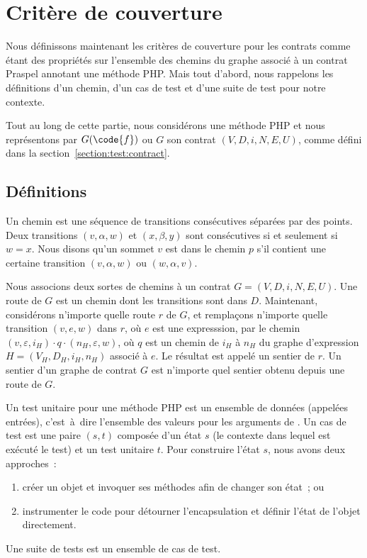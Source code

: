 \section{Critère de couverture}
\label{section:test:criteria}

Nous définissons maintenant les critères de couverture pour les contrats comme
étant des propriétés sur l'ensemble des chemins du graphe associé à un contrat
Praspel annotant une méthode PHP. Mais tout d'abord, nous rappelons les
définitions d'un chemin, d'un cas de test et d'une suite de test pour notre
contexte.

Tout au long de cette partie, nous considérons une méthode PHP  et nous
représentons par $G(\code{f})$ ou $G$ son contrat $(V, D, i, N, E, U)$, comme
défini dans la section~\ref{section:test:contract}.

\subsection{Définitions}

Un {\strong chemin} est une séquence de transitions consécutives séparées par
des points. Deux transitions $(v, \alpha, w)$ et $(x, \beta, y)$ sont
consécutives si et seulement si $w = x$. Nous disons qu'un sommet $v$ {\strong
est dans} le chemin $p$ s'il contient une certaine transition $(v, \alpha, w)$
ou $(w, \alpha, v)$.

Nous associons deux sortes de chemins à un contrat $G = (V, D, i, N, E, U)$. Une
{\strong route} de $G$ est un chemin dont les transitions sont dans $D$.
Maintenant, considérons n'importe quelle route $r$ de $G$, et remplaçons
n'importe quelle transition $(v, e, w)$ dans $r$, où $e$ est une expresssion,
par le chemin $(v, \varepsilon, i_H) \cdot q \cdot (n_H, \varepsilon, w)$, où
$q$ est un chemin de $i_H$ à $n_H$ du graphe d'expression $H = (V_H, D_H, i_H,
n_H)$ associé à $e$.  Le résultat est appelé un {\strong sentier} de $r$. Un
sentier d'un graphe de contrat $G$ est n'importe quel sentier obtenu depuis une
route de $G$.

Un {\strong test unitaire} pour une méthode PHP  est un ensemble de
données (appelées entrées), c'est~à~dire l'ensemble des valeurs pour les
arguments de . Un {\strong cas de test} est une paire $(s, t)$ composée
d'un état $s$ (le contexte dans lequel est exécuté le test) et un test unitaire
$t$. Pour construire l'état $s$, nous avons deux approches~:
%
\begin{enumerate}

\item créer un objet et invoquer ses méthodes afin de changer son état~; ou

\item instrumenter le code pour détourner l'encapsulation et définir l'état de
l'objet directement.

\end{enumerate}
%
Une {\strong suite de tests} est un ensemble de cas de test.

